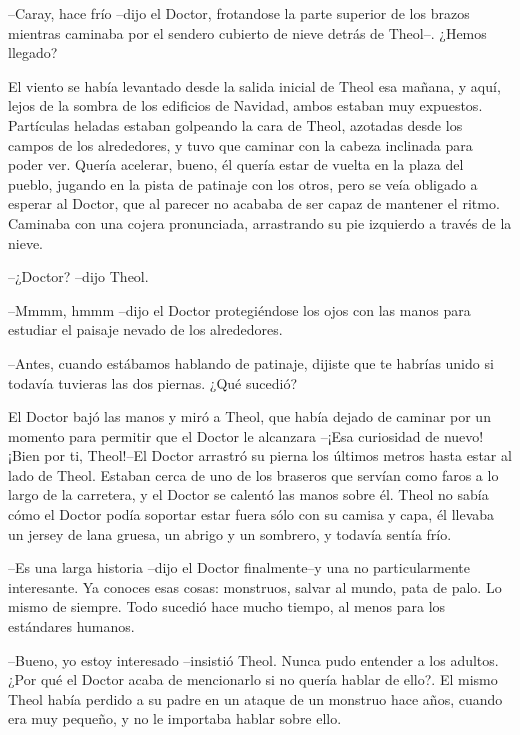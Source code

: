 --Caray, hace frío --dijo el Doctor, frotandose la parte superior de los brazos mientras caminaba por el sendero cubierto de nieve detrás de Theol--. ¿Hemos llegado?



El viento se había levantado desde la salida inicial de Theol esa mañana, y aquí, lejos de la sombra de los edificios de Navidad, ambos estaban muy expuestos. Partículas heladas estaban golpeando la cara de Theol, azotadas desde los campos de los alrededores, y tuvo que caminar con la cabeza inclinada para poder ver. Quería acelerar, bueno, él quería estar de vuelta en la plaza del pueblo, jugando en la pista de patinaje con los otros, pero se veía obligado a esperar al Doctor, que al parecer no acababa de ser capaz de mantener el ritmo. Caminaba con una cojera pronunciada, arrastrando su pie izquierdo a través de la nieve.



--¿Doctor? --dijo Theol.



--Mmmm, hmmm --dijo el Doctor protegiéndose los ojos con las manos para estudiar el paisaje nevado de los alrededores.



--Antes, cuando estábamos hablando de patinaje, dijiste que te habrías unido si todavía tuvieras las dos piernas. ¿Qué sucedió?



El Doctor bajó las manos y miró a Theol, que había dejado de caminar por un momento para permitir que el Doctor le alcanzara --¡Esa curiosidad de nuevo! ¡Bien por ti, Theol!--El Doctor arrastró su pierna los últimos metros hasta estar al lado de Theol. Estaban cerca de uno de los braseros que servían como faros a lo largo de la carretera, y el Doctor se calentó las manos sobre él. Theol no sabía cómo el Doctor podía soportar estar fuera sólo con su camisa y capa, él llevaba un jersey de lana gruesa, un abrigo y un sombrero, y todavía sentía frío.



--Es una larga historia --dijo el Doctor finalmente--y una no particularmente interesante. Ya conoces esas cosas: monstruos, salvar al mundo, pata de palo. Lo mismo de siempre. Todo sucedió hace mucho tiempo, al menos para los estándares humanos.



--Bueno, yo estoy interesado --insistió Theol. Nunca pudo entender a los adultos. ¿Por qué el Doctor acaba de mencionarlo si no quería hablar de ello?. El mismo Theol había perdido a su padre en un ataque de un monstruo hace años, cuando era muy pequeño, y no le importaba hablar sobre ello.



